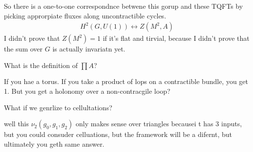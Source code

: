 So there is a one-to-one correspondnce betwene this gorup and these TQFTs by
picking approrpiate fluxes along uncontractible cycles.
\begin{align}
    H^2(G, U(1)) \leftrightarrow Z(M^2, A)
\end{align}
I didn't prove that $Z(M^2)=1$ if it's flat and tirvial,
because I didn't prove that the sum over $G$ is actually invariatn yet.

\begin{question}
    What is the definition of $\prod A$?
\end{question}
If you hae a torus.
If you take a product of lops on a contractible bundle,
you get 1.
But you get a holonomy over a non-contracgile loop?

\begin{question}
    What if we genrlize to cellultations?
\end{question}
well this $\nu_2(g_0, g_1, g_2)$ only makes sense over triangles becausei t has
3 inputs,
but you could consuder celluations,
but the framework will be a difernt,
but ultimately you geth same answer.
